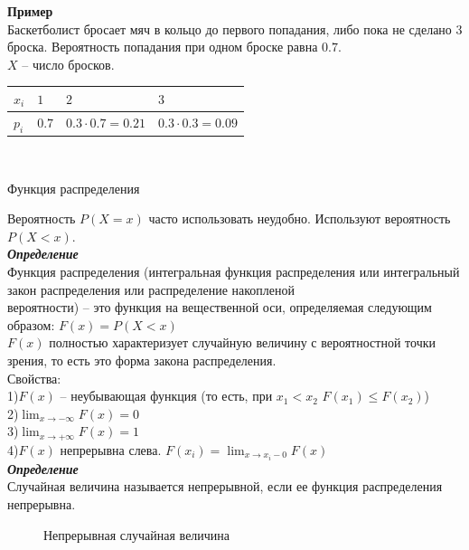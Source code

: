 \documentclass[russian, 12pt, fleqn,x11names]{article}
\begin{document}
\newpage
\noindent
\textbf{Пример\ }\\
Баскетболист бросает мяч в кольцо до первого попадания, либо пока не сделано 3 броска. Вероятность попадания при одном броске равна $0.7$.\\
$X$ -- число бросков.\\
\begin{tabular}[b]{ | l | l | l | l | }
\hline
$x_i$&$1$&$2$&$3$\\
\hline
$p_i$&$0.7$&$0.3\cdot0.7=0.21$&$0.3\cdot0.3 = 0.09$\\
\hline
\end{tabular}
\\
\begin{center}
$\textbf{Функция распределения }$\\
\end{center}
Вероятность $P(X=x)$ часто использовать неудобно. Используют вероятность $P(X<x).$\\
\textit{\textbf{Определение}}\\
Функция распределения (интегральная функция распределения или интегральный закон распределения или распределение накопленой\\ вероятности)  -- это функция на вещественной оси, определяемая следующим образом: $F(x)=P(X<x)$\\
$F(x)$ полностью характеризует случайную величину с вероятностной точки зрения, то есть это форма закона распределения.\\
Свойства:\\
1)$F(x)$ -- неубывающая функция (то есть, при $x_1 < x_2$ $F(x_1) \leq F(x_2)$)\\
2)$\displaystyle{  \lim_{x\to{-\infty}}  } F(x) = 0$\\
3)$\displaystyle{  \lim_{x\to{+\infty}}  } F(x)  = 1$\\
4)$F(x)$ непрерывна слева. $\displaystyle{ F(x_i) = \lim_{x\to{x_i - 0}} F(x) }$ \\
\textit{\textbf{Определение}}\\
Случайная величина называется непрерывной, если ее функция распределения непрерывна.\\
\newpage
\begin{figure}[!h]

\caption{Непрерывная случайная величина}
\end{figure}
\end{document}
